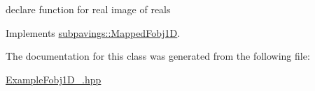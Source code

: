 declare function for real image of reals 



\-Implements \hyperlink{classsubpavings_1_1MappedFobj1D_abee3fbd4c06d7d2f6e276f31d485eb7c}{subpavings\-::\-Mapped\-Fobj1\-D}.



\-The documentation for this class was generated from the following file\-:\begin{DoxyCompactItemize}
\item 
\hyperlink{ExampleFobj1D__2_8hpp}{\-Example\-Fobj1\-D\-\_.\-hpp}\end{DoxyCompactItemize}
